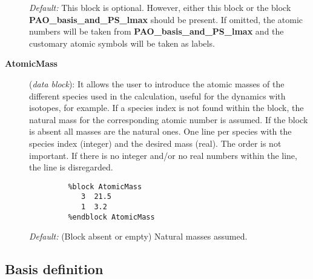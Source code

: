 \begin{description}
{\it Default:} This block is optional. However, either this block or the block
{\bf PAO\_basis\_and\_PS\_lmax} should be present. If omitted, 
the atomic numbers will be taken from {\bf PAO\_basis\_and\_PS\_lmax}
and the customary atomic symbols will be taken as labels.


\item[{\bf AtomicMass}] ({\it data block}): It allows the user to introduce
the atomic masses of the different species used in the calculation, useful
for the dynamics with isotopes, for example. If
a species index is not found within the block, the natural mass for the 
corresponding atomic number is assumed. If the block is absent all masses
are the natural ones. One line per species with the species index (integer)
and the desired mass (real). The order is not important. If there is no 
integer and/or no real numbers within the line, the line is disregarded.

\begin{verbatim}
         %block AtomicMass
            3  21.5
            1  3.2 
         %endblock AtomicMass
\end{verbatim}

{\it Default:} (Block absent or empty) Natural masses assumed.


\end{description}


\vspace{5pt}
\subsection{Basis definition}

